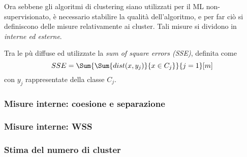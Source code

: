 \documentclass{subfiles}
\begin{document}
Ora sebbene gli algoritmi di clustering siano utilizzati per il ML non-supervisionato, è necessario stabilire la qualità dell'algoritmo,
e per far ciò si definiscono delle misure relativamente ai cluster. Tali misure si dividono in \emph{interne \emph{ed} esterne}.

Tra le pù diffuse ed utilizzate la \emph{sum of square errors (SSE)}, definita come
\[
    SSE = \Sum{\Sum{dist(x, y_{j})}{x \in C_{j}}}{j = 1}[m]
\]
con \(y_{j}\) rappresentate della classe \(C_{j}\).

\subsubsection{Misure interne: coesione e separazione}


\subsubsection{Misure interne: WSS}


\subsubsection{Stima del numero di cluster}

\end{document}

